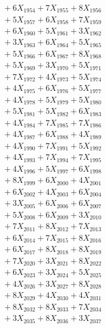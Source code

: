 \documentclass[a4paper,10pt]{article}
\begin{document}
{\begin{align}
&\;  + 6 X_{1954} + 7 X_{1955} + 8 X_{1956} \\[0.3ex]
&\;  + 5 X_{1957} + 6 X_{1958} + 7 X_{1959} \\[0.5ex]\allowbreak
&\;  + 6 X_{1960} + 5 X_{1961} + 3 X_{1962} \\[0.3ex]
&\;  + 3 X_{1963} + 6 X_{1964} + 5 X_{1965} \\[0.3ex]
&\;  + 5 X_{1966} + 6 X_{1967} + 8 X_{1968} \\[0.3ex]
&\;  + 5 X_{1969} + 3 X_{1970} + 5 X_{1971} \\[0.3ex]
&\;  + 7 X_{1972} + 4 X_{1973} + 5 X_{1974} \\[0.3ex]
&\;  + 4 X_{1975} + 6 X_{1976} + 5 X_{1977} \\[0.3ex]
&\;  + 4 X_{1978} + 5 X_{1979} + 5 X_{1980} \\[0.3ex]
&\;  + 5 X_{1981} + 5 X_{1982} + 6 X_{1983} \\[0.3ex]
&\;  + 4 X_{1984} + 7 X_{1985} + 7 X_{1986} \\[0.3ex]
&\;  + 4 X_{1987} + 6 X_{1988} + 4 X_{1989} \\[0.5ex]\allowbreak
&\;  + 4 X_{1990} + 7 X_{1991} + 5 X_{1992} \\[0.3ex]
&\;  + 4 X_{1993} + 7 X_{1994} + 7 X_{1995} \\[0.3ex]
&\;  + 4 X_{1996} + 5 X_{1997} + 6 X_{1998} \\[0.3ex]
&\;  + 8 X_{1999} + 6 X_{2000} + 4 X_{2001} \\[0.3ex]
&\;  + 6 X_{2002} + 4 X_{2003} + 6 X_{2004} \\[0.3ex]
&\;  + 3 X_{2005} + 6 X_{2006} + 6 X_{2007} \\[0.3ex]
&\;  + 5 X_{2008} + 6 X_{2009} + 3 X_{2010} \\[0.3ex]
&\;  + 7 X_{2011} + 8 X_{2012} + 7 X_{2013} \\[0.3ex]
&\;  + 6 X_{2014} + 7 X_{2015} + 8 X_{2016} \\[0.3ex]
&\;  + 6 X_{2017} + 8 X_{2018} + 8 X_{2019} \\[0.5ex]\allowbreak
&\;  + 7 X_{2020} + 3 X_{2021} + 8 X_{2022} \\[0.3ex]
&\;  + 6 X_{2023} + 3 X_{2024} + 5 X_{2025} \\[0.3ex]
&\;  + 4 X_{2026} + 3 X_{2027} + 8 X_{2028} \\[0.3ex]
&\;  + 8 X_{2029} + 4 X_{2030} + 4 X_{2031} \\[0.3ex]
&\;  + 8 X_{2032} + 8 X_{2033} + 7 X_{2034} \\[0.3ex]
&\;  + 3 X_{2035} + 8 X_{2036} + 3 X_{2037} \\[0.3ex]

\end{align}}
\end{document}
